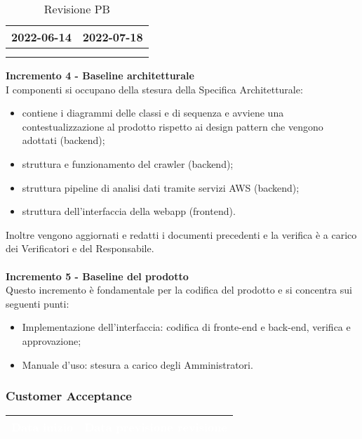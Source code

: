 {{{\begin{longtable}{C{.4\freewidth} C{.4\freewidth}}
        2022-06-14 & 2022-07-18 \\
        \bottomrule
        \\
        \caption{Revisione PB}
        \end{longtable}
    \textbf{Incremento 4 - Baseline architetturale} \\
    I componenti si occupano della stesura della Specifica Architetturale: 
    \begin{itemize}
        \item contiene i diagrammi delle classi e di sequenza e avviene una contestualizzazione al prodotto rispetto ai design pattern che vengono adottati (backend);
        \item struttura e funzionamento del crawler (backend);
        \item struttura pipeline di analisi dati tramite servizi AWS (backend);
        \item struttura dell'interfaccia della webapp (frontend).
    \end{itemize}
    Inoltre vengono aggiornati e redatti i documenti precedenti e la verifica è a carico dei Verificatori e del Responsabile.\\ \\
    \textbf{Incremento 5 - Baseline del prodotto} \\
    Questo incremento è fondamentale per la codifica del prodotto e si concentra sui seguenti punti:
    \begin{itemize}
        \item Implementazione dell'interfaccia: codifica di fronte-end e back-end, verifica e approvazione;
        \item Manuale d'uso: stesura a carico degli Amministratori.
    \end{itemize}
    }
\newpage
    \subsubsection{Customer Acceptance} {
        \setlength{\freewidth}{\dimexpr\textwidth-30\tabcolsep}
        \renewcommand{\arraystretch}{1.0}
        \setlength{\aboverulesep}{0pt}
        \setlength{\belowrulesep}{0pt}
        \begin{longtable}{C{.4\freewidth} C{.4\freewidth}}
        \toprule
        \textcolor{white}{\textbf{Data inizio}}&
        \textcolor{white}{\textbf{Data previsione revisione}} \\
        \toprule
        \endhead
            

\end{longtable}}}}
